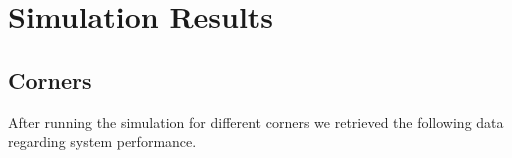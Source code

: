 \section{Simulation Results} \label{sec:simulation_results}







\subsection{Corners}
After running the simulation for different corners we retrieved the following data regarding system performance. 


